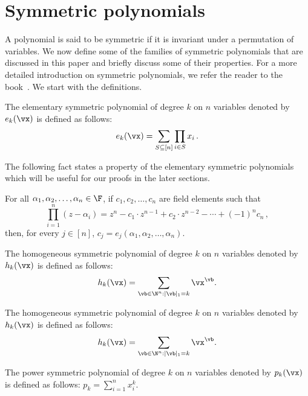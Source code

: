 \section{Symmetric polynomials}
\label{sec:prelim-sym-poly}
A polynomial is said to be symmetric if it is invariant under a permutation of variables. We now define some of the families of symmetric polynomials that are discussed in this paper and briefly discuss some of their properties. For a more detailed introduction on symmetric polynomials, we refer the reader to the book~\cite{r28}. We start with the definitions.
\begin{definition}\label{def:esym}
The elementary symmetric polynomial of degree $k$ on $n$ variables denoted by $e_k(\vx)$ is defined as follows:
\[
e_k(\vx) = \sum_{S\subseteq [n]} \prod_{i \in S} x_i \, .
\]
\end{definition}
The following fact states a property of the elementary symmetric polynomials which will be useful for our proofs in the later sections. 
\begin{fact}\label{fact:esym and roots}
For all $\alpha_1, \alpha_2, \ldots, \alpha_n \in \F$, if $c_1, c_2, \ldots, c_n$ are field elements such that \[
\prod_{i = 1}^n (z-\alpha_i) = z^{n} - c_1\cdot z^{n-1} + c_2\cdot z^{n-2}- \cdots + (-1)^{n} c_n \, ,
\]
then, for every $j \in [n]$, $c_j = e_j(\alpha_1, \alpha_2, \ldots, \alpha_n)$.
\end{fact}

\begin{definition} The homogeneous symmetric polynomial of degree $k$ on $n$ variables denoted by $h_k(\vx)$ is defined as follows:
	$$h_k(\vx)=\sum_{\vb \in \N^n: |\vb|_1 = k} \vx^\vb.$$ 
\end{definition}

\begin{definition} The homogeneous symmetric polynomial of degree $k$ on $n$ variables denoted by $h_k(\vx)$ is defined as follows:
	$$h_k(\vx)=\sum_{\vb \in \N^n: |\vb|_1 = k} \vx^\vb.$$ 
\end{definition}

\begin{definition} The power symmetric polynomial of degree $k$ on $n$ variables denoted by $p_k(\vx)$ is defined as follows:
	$p_k= \sum_{i=1}^n  x_i^k$.
\end{definition}

